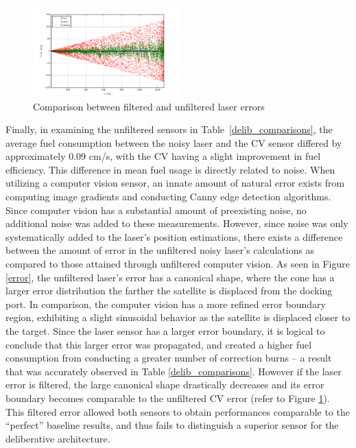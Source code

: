 \documentclass[journal, 10pt]{IEEEtran}
\begin{document}
\begin{figure}
\begin{center}
\includegraphics[width=0.5\textwidth]{figures/lasererror.pdf}
\caption{Comparison between filtered and unfiltered laser errors}
\label{laser_error}
\end{center}
\end{figure}

Finally, in examining the unfiltered sensors in Table~\ref{delib_comparisons}, the average fuel consumption between the noisy laser and the CV sensor differed by approximately 0.09 cm/s, with the CV having a slight improvement in fuel efficiency. This difference in mean fuel usage is directly related to noise. When utilizing a computer vision sensor, an innate amount of natural error exists from computing image gradients and conducting Canny edge detection algorithms. Since computer vision has a substantial amount of preexisting noise, no additional noise was added to these measurements. However, since noise was only systematically added to the laser's position estimations, there exists a difference between the amount of error in the unfiltered noisy laser's calculations as compared to those attained through unfiltered computer vision. As seen in Figure \ref{error}, the unfiltered laser's error has a canonical shape, where the cone has a larger error distribution the farther the satellite is displaced from the docking port. In comparison, the computer vision has a more refined error boundary region, exhibiting a slight sinusoidal behavior as the satellite is displaced closer to the target. Since the laser sensor has a larger error boundary, it is logical to conclude that this larger error was propagated, and created a higher fuel consumption from conducting a greater number of correction burns -- a result that was accurately observed in Table \ref{delib_comparisons}. However if the laser error is filtered, the large canonical shape drastically decreases and its error boundary becomes comparable to the unfiltered CV error (refer to Figure \ref{laser_error}). This filtered error allowed both sensors to obtain performances comparable to the ``perfect'' baseline results, and thus fails to distinguish a superior sensor for the deliberative architecture. 
\end{document}
